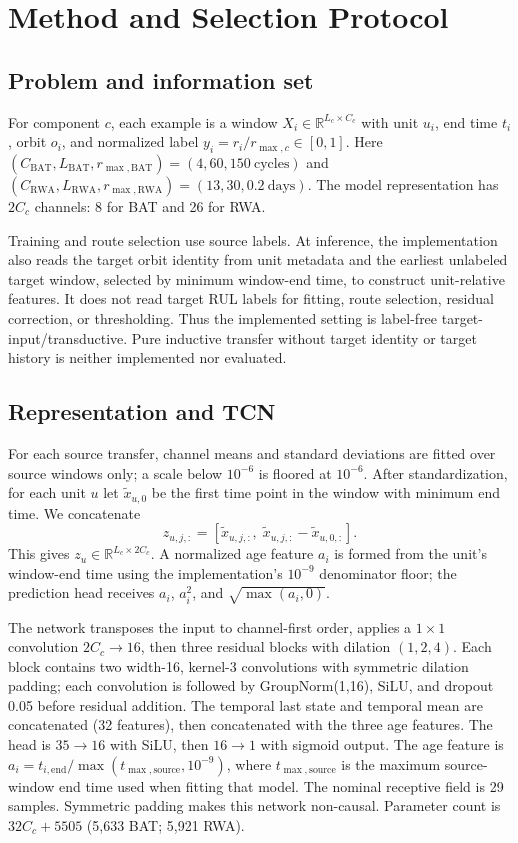 \documentclass[journal]{IEEEtran}
\begin{document}
\section{Method and Selection Protocol}\label{sec:method}
\subsection{Problem and information set}
For component $c$, each example is a window $X_i\in\mathbb{R}^{L_c\times C_c}$ with unit $u_i$, end time $t_i$, orbit $o_i$, and normalized label $y_i=r_i/r_{\max,c}\in[0,1]$. Here $(C_{\mathrm{BAT}},L_{\mathrm{BAT}},r_{\max,\mathrm{BAT}})=(4,60,150\ \mathrm{cycles})$ and $(C_{\mathrm{RWA}},L_{\mathrm{RWA}},r_{\max,\mathrm{RWA}})=(13,30,0.2\ \mathrm{days})$. The model representation has $2C_c$ channels: 8 for BAT and 26 for RWA.

Training and route selection use source labels. At inference, the implementation also reads the target orbit identity from unit metadata and the earliest unlabeled target window, selected by minimum window-end time, to construct unit-relative features. It does not read target RUL labels for fitting, route selection, residual correction, or thresholding. Thus the implemented setting is label-free target-input/transductive. Pure inductive transfer without target identity or target history is neither implemented nor evaluated.

\subsection{Representation and TCN}
For each source transfer, channel means and standard deviations are fitted over source windows only; a scale below $10^{-6}$ is floored at $10^{-6}$. After standardization, for each unit $u$ let $\tilde x_{u,0}$ be the first time point in the window with minimum end time. We concatenate
\begin{equation}
 z_{u,j,:}=\left[\tilde x_{u,j,:},\;\tilde x_{u,j,:}-\tilde x_{u,0,:}\right].
\end{equation}
This gives $z_u\in\mathbb{R}^{L_c\times 2C_c}$. A normalized age feature $a_i$ is formed from the unit's window-end time using the implementation's $10^{-9}$ denominator floor; the prediction head receives $a_i$, $a_i^2$, and $\sqrt{\max(a_i,0)}$.

The network transposes the input to channel-first order, applies a $1\times1$ convolution $2C_c\to16$, then three residual blocks with dilation $(1,2,4)$. Each block contains two width-16, kernel-3 convolutions with symmetric dilation padding; each convolution is followed by GroupNorm(1,16), SiLU, and dropout 0.05 before residual addition. The temporal last state and temporal mean are concatenated (32 features), then concatenated with the three age features. The head is $35\to16$ with SiLU, then $16\to1$ with sigmoid output. The age feature is $a_i=t_{i,\mathrm{end}}/\max(t_{\max,\mathrm{source}},10^{-9})$, where $t_{\max,\mathrm{source}}$ is the maximum source-window end time used when fitting that model. The nominal receptive field is 29 samples. Symmetric padding makes this network non-causal. Parameter count is $32C_c+5505$ (5,633 BAT; 5,921 RWA).
\end{document}
